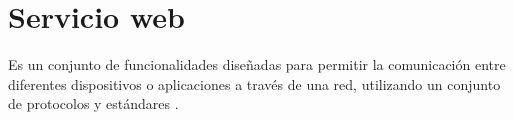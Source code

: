 \section{Servicio web} \label{Servicio web}

Es un conjunto de funcionalidades diseñadas para permitir la comunicación entre diferentes dispositivos o aplicaciones a través de una red, utilizando un conjunto de protocolos y estándares \cite{WBS0}.